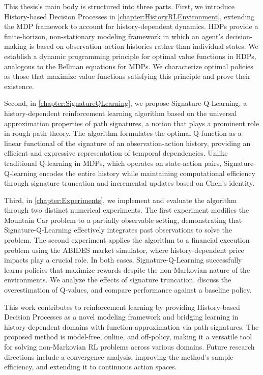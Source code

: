 \documentclass[
    a4paper,
    11pt,
    bibliography=totoc,
    listof=totoc,      
    headinclude=true,
    cleardoublepage=empty,
]{scrbook}
\theoremstyle{plain}
\theoremstyle{definition}
\theoremstyle{remark}
\begin{document}
This thesis's main body is structured into three parts. First, we introduce History-based Decision Processes in \cref{chapter:HistoryRLEnvironment}, extending the MDP framework to account for history-dependent dynamics. HDPs provide a finite-horizon, non-stationary modeling framework in which an agent’s decision-making is based on observation–action histories rather than individual states. We establish a dynamic programming principle for optimal value functions in HDPs, analogous to the Bellman equations for MDPs. We characterize optimal policies as those that maximize value functions satisfying this principle and prove their existence.

Second, in \cref{chapter:SignatureQLearning}, we propose Signature-Q-Learning, a history-dependent reinforcement learning algorithm based on the universal approximation properties of path signatures, a notion that plays a prominent role in rough path theory. The algorithm formulates the optimal Q-function as a linear functional of the signature of an observation-action history, providing an efficient and expressive representation of temporal dependencies. Unlike traditional Q-learning in MDPs, which operates on state-action pairs, Signature-Q-learning encodes the entire history while maintaining computational efficiency through signature truncation and incremental updates based on Chen’s identity.

Third, in \cref{chapter:Experiments}, we implement and evaluate the algorithm through two distinct numerical experiments. The first experiment modifies the Mountain Car problem to a partially observable setting, demonstrating that Signature-Q-Learning effectively integrates past observations to solve the problem. The second experiment applies the algorithm to a financial execution problem using the ABIDES market simulator, where history-dependent price impacts play a crucial role. In both cases, Signature-Q-Learning successfully learns policies that maximize rewards despite the non-Markovian nature of the environments. We analyze the effects of signature truncation, discuss the overestimation of Q-values, and compare performance against a baseline policy.

This work contributes to reinforcement learning by providing History-based Decision Processes as a novel modeling framework and bridging learning in history-dependent domains with function approximation via path signatures. The proposed method is model-free, online, and off-policy, making it a versatile tool for solving non-Markovian RL problems across various domains. Future research directions include a convergence analysis, improving the method's sample efficiency, and extending it to continuous action spaces.
\end{document}
